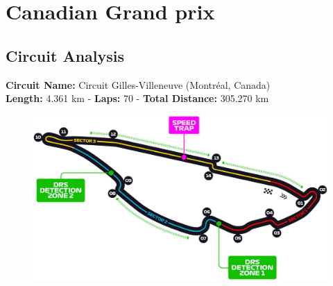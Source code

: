 \section{Canadian Grand prix}

\subsection{Circuit Analysis}

\textbf{Circuit Name:} Circuit Gilles-Villeneuve (Montréal, Canada) \\
\textbf{Length:} 4.361 km - \textbf{Laps:} 70 - \textbf{Total Distance:} 305.270 km

\begin{figure}[H]
    \centering
    \includegraphics[width=0.75\linewidth]{images/9.Canada_Circuit.jpg}
\end{figure}

